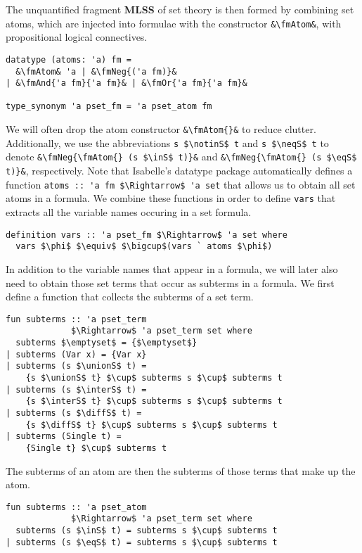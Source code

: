 \documentclass[sigplan,10pt,anonymous,review]{acmart}
\newcommand{\MLSS}{\textbf{MLSS}}
\newcommand{\unionS}{\sqcup_\text{s}}
\newcommand{\interS}{\sqcap_\text{s}}
\newcommand{\diffS}{-_\text{s}}
\newcommand{\inS}{\in_\text{s}}
\newcommand{\notinS}{\notin_\text{s}}
\newcommand{\eqS}{=_\text{s}}
\newcommand{\neqS}{\neq_\text{s}}
\newcommand{\fmAnd}[2]{#1 $\boldsymbol{\land}$ #2}
\newcommand{\fmOr}[2]{#1 $\boldsymbol{\lor}$ #2}
\newcommand{\fmNegSymbol}{\boldsymbol{\neg}}
\newcommand{\fmNeg}[1]{$\fmNegSymbol$ #1}
\newcommand{\fmAtom}{\textbf{A}}
\begin{document}
The unquantified fragment \MLSS{} of set theory is then formed by combining set atoms, which are injected into formulae with the constructor \lstinline!&\fmAtom&!, with propositional logical connectives.
\begin{lstlisting}
datatype (atoms: 'a) fm =
  &\fmAtom& 'a | &\fmNeg{('a fm)}&
| &\fmAnd{'a fm}{'a fm}& | &\fmOr{'a fm}{'a fm}&

type_synonym 'a pset_fm = 'a pset_atom fm
\end{lstlisting}
We will often drop the atom constructor \lstinline!&\fmAtom{}&! to reduce clutter.
Additionally, we use the abbreviations \lstinline!s $\notinS$ t! and \lstinline!s $\neqS$ t! to denote \lstinline!&\fmNeg{\fmAtom{} (s $\inS$ t)}&! and \lstinline!&\fmNeg{\fmAtom{} (s $\eqS$ t)}&!, respectively.
Note that Isabelle's datatype package automatically defines a function \lstinline!atoms :: 'a fm $\Rightarrow$ 'a set! that allows us to obtain all set atoms in a formula.
We combine these functions in order to define \lstinline!vars! that extracts all the variable names occuring in a set formula.
\begin{lstlisting}
definition vars :: 'a pset_fm $\Rightarrow$ 'a set where
  vars $\phi$ $\equiv$ $\bigcup$(vars ` atoms $\phi$)
\end{lstlisting}
In addition to the variable names that appear in a formula, we will later also need to obtain those set terms that occur as subterms in a formula. 
We first define a function that collects the subterms of a set term.
\begin{lstlisting}
fun subterms :: 'a pset_term
             $\Rightarrow$ 'a pset_term set where
  subterms $\emptyset$ = {$\emptyset$}
| subterms (Var x) = {Var x}
| subterms (s $\unionS$ t) =
    {s $\unionS$ t} $\cup$ subterms s $\cup$ subterms t
| subterms (s $\interS$ t) =
    {s $\interS$ t} $\cup$ subterms s $\cup$ subterms t
| subterms (s $\diffS$ t) =
    {s $\diffS$ t} $\cup$ subterms s $\cup$ subterms t
| subterms (Single t) =
    {Single t} $\cup$ subterms t
\end{lstlisting}
The subterms of an atom are then the subterms of those terms that make up the atom.
\begin{lstlisting}
fun subterms :: 'a pset_atom
             $\Rightarrow$ 'a pset_term set where
  subterms (s $\inS$ t) = subterms s $\cup$ subterms t
| subterms (s $\eqS$ t) = subterms s $\cup$ subterms t
\end{lstlisting}
\end{document}
